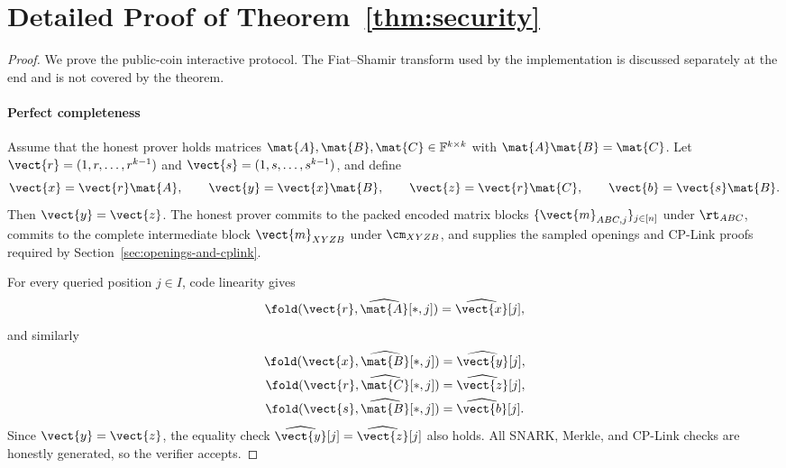 \fi
\section{Detailed Proof of Theorem~\ref{thm:security}}
\label{app:security-proof}

\begin{proof}
We prove the public-coin interactive protocol. The Fiat--Shamir transform used
by the implementation is discussed separately at the end and is not covered by
the theorem.

\paragraph{Perfect completeness}
Assume that the honest prover holds matrices
\(\mat{A},\mat{B},\mat{C}\in\mathbb{F}^{k\times k}\) with
\(\mat{A}\mat{B}=\mat{C}\).  Let
\(\vect{r}=(1,r,\ldots,r^{k-1})\) and
\(\vect{s}=(1,s,\ldots,s^{k-1})\), and define
\[
  \vect{x}=\vect{r}\mat{A},
  \qquad
  \vect{y}=\vect{x}\mat{B},
  \qquad
  \vect{z}=\vect{r}\mat{C},
  \qquad
  \vect{b}=\vect{s}\mat{B}.
\]
Then \(\vect{y}=\vect{z}\).  The honest prover commits to the packed encoded
matrix blocks \(\{\vect{m}_{ABC,j}\}_{j\in[n]}\) under \(\rt_{ABC}\), commits
to the complete intermediate block \(\vect{m}_{XYZB}\) under
\(\cm_{XYZB}\), and supplies the sampled openings and CP-Link proofs required
by Section~\ref{sec:openings-and-cplink}.

For every queried position \(j\in I\), code linearity gives
\[
  \fold(\vect{r},\widehat{\mat{A}}[*,j])
  =
  \widehat{\vect{x}}[j],
\]
and similarly
\[
\begin{aligned}
  \fold(\vect{x},\widehat{\mat{B}}[*,j])
  &= \widehat{\vect{y}}[j],\\
  \fold(\vect{r},\widehat{\mat{C}}[*,j])
  &= \widehat{\vect{z}}[j],\\
  \fold(\vect{s},\widehat{\mat{B}}[*,j])
  &= \widehat{\vect{b}}[j].
\end{aligned}
\]
Since \(\vect{y}=\vect{z}\), the equality check
\(\widehat{\vect{y}}[j]=\widehat{\vect{z}}[j]\) also holds.  All SNARK,
Merkle, and CP-Link checks are honestly generated, so the verifier accepts.


\end{proof}
